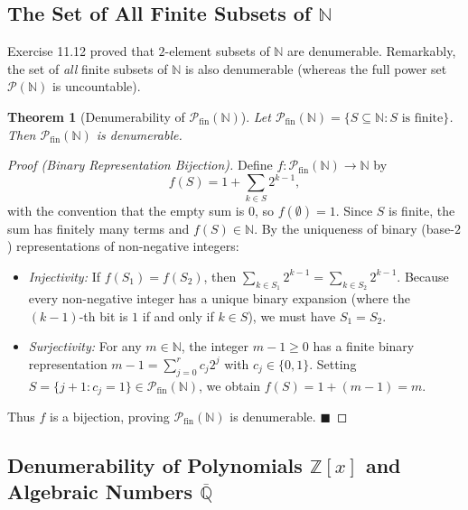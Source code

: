 \documentclass[11pt, letterpaper]{article}
\newtheorem{theorem}{Theorem}[section]
\theoremstyle{definition}
\theoremstyle{remark}
\begin{document}
\subsection{The Set of All Finite Subsets of $\mathbb{N}$}

Exercise 11.12 proved that $2$-element subsets of $\mathbb{N}$ are denumerable. Remarkably, the set of \textit{all} finite subsets of $\mathbb{N}$ is also denumerable (whereas the full power set $\mathcal{P}(\mathbb{N})$ is uncountable).

\begin{theorem}[Denumerability of $\mathcal{P}_{\mathrm{fin}}(\mathbb{N})$]
Let $\mathcal{P}_{\mathrm{fin}}(\mathbb{N}) = \{S \subseteq \mathbb{N} : S \text{ is finite}\}$. Then $\mathcal{P}_{\mathrm{fin}}(\mathbb{N})$ is denumerable.
\end{theorem}

\begin{proof}[Proof (Binary Representation Bijection)]
Define $f : \mathcal{P}_{\mathrm{fin}}(\mathbb{N}) \to \mathbb{N}$ by
\[
f(S) = 1 + \sum_{k \in S} 2^{k - 1},
\]
with the convention that the empty sum is $0$, so $f(\emptyset) = 1$. Since $S$ is finite, the sum has finitely many terms and $f(S) \in \mathbb{N}$. By the uniqueness of binary (base-$2$) representations of non-negative integers:
\begin{itemize}
    \item \textit{Injectivity:} If $f(S_1) = f(S_2)$, then $\sum_{k \in S_1} 2^{k-1} = \sum_{k \in S_2} 2^{k-1}$. Because every non-negative integer has a unique binary expansion (where the $(k-1)$-th bit is $1$ if and only if $k \in S$), we must have $S_1 = S_2$.
    \item \textit{Surjectivity:} For any $m \in \mathbb{N}$, the integer $m - 1 \geq 0$ has a finite binary representation $m - 1 = \sum_{j=0}^{r} c_j 2^j$ with $c_j \in \{0, 1\}$. Setting $S = \{j + 1 : c_j = 1\} \in \mathcal{P}_{\mathrm{fin}}(\mathbb{N})$, we obtain $f(S) = 1 + (m - 1) = m$.
\end{itemize}
Thus $f$ is a bijection, proving $\mathcal{P}_{\mathrm{fin}}(\mathbb{N})$ is denumerable. $\blacksquare$
\end{proof}

\subsection{Denumerability of Polynomials $\mathbb{Z}[x]$ and Algebraic Numbers $\overline{\mathbb{Q}}$}
\end{document}
